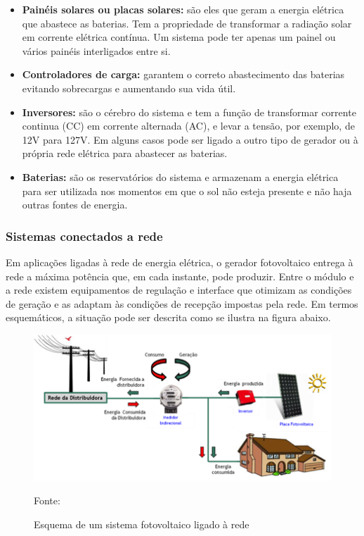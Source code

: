  \begin{itemize}
        \item \textbf{Pain\'eis solares ou placas solares:} s\~ao eles que geram a energia el\'etrica que abastece as baterias. Tem a propriedade de transformar a radia\c{c}\~ao solar em corrente el\'etrica cont\'inua. Um sistema pode ter apenas um painel ou v\'arios pain\'eis interligados entre si.
	\item \textbf{Controladores de carga:} garantem o correto abastecimento das baterias evitando sobrecargas e aumentando sua vida \'util.
	\item \textbf{Inversores:} s\~ao o c\'erebro do sistema e tem a fun\c{c}\~ao de transformar corrente continua (CC) em corrente alternada (AC), e levar a tens\~ao, por exemplo, de 12V para 127V. Em alguns casos pode ser ligado a outro tipo de gerador ou \`a pr\'opria rede el\'etrica para abastecer as baterias.
	\item \textbf{Baterias:} s\~ao os reservat\'orios do sistema e armazenam a energia el\'etrica para ser utilizada nos momentos em que o sol n\~ao esteja presente e n\~ao haja outras fontes de energia.
\end{itemize}

\subsubsection{Sistemas conectados a rede}

Em aplica\c{c}\~oes ligadas \`a rede de energia el\'etrica, o gerador fotovoltaico entrega \`a rede a m\'axima pot\^encia que, em cada instante, pode produzir. Entre o m\'odulo e a rede existem equipamentos de regula\c{c}\~ao e interface que otimizam as condi\c{c}\~oes de gera\c{c}\~ao e as adaptam \`as condi\c{c}\~oes de recep\c{c}\~ao impostas pela rede. Em termos esquem\'aticos, a situa\c{c}\~ao pode ser descrita como se ilustra na figura abaixo.

\begin{figure}[H]
	\centering
	\label{SistemaFotovoltaico}
		\includegraphics[keepaspectratio=true,scale=0.8]{figuras/SistemaFotovoltaico.png}
	\caption{Esquema de um sistema fotovoltaico ligado \`a rede}
	\small{Fonte:  \cite{Viridian}}
\end{figure}

